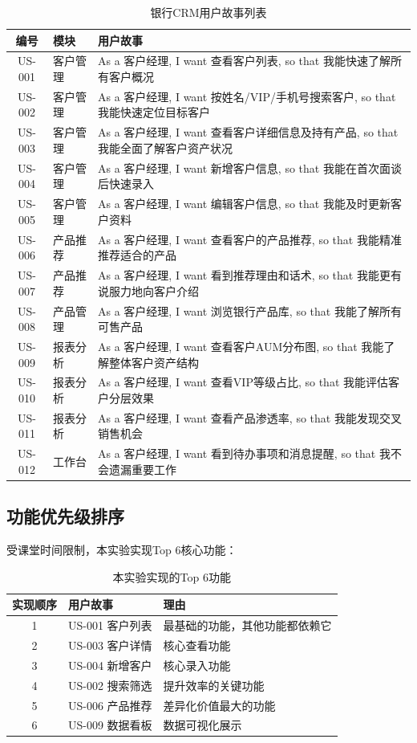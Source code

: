 \begin{table}[H]
\centering
\small
\begin{tabular}{clp{7.5cm}}
\toprule
\textbf{编号} & \textbf{模块} & \textbf{用户故事} \\
\midrule
US-001 & 客户管理 & As a 客户经理, I want 查看客户列表, so that 我能快速了解所有客户概况 \\
US-002 & 客户管理 & As a 客户经理, I want 按姓名/VIP/手机号搜索客户, so that 我能快速定位目标客户 \\
US-003 & 客户管理 & As a 客户经理, I want 查看客户详细信息及持有产品, so that 我能全面了解客户资产状况 \\
US-004 & 客户管理 & As a 客户经理, I want 新增客户信息, so that 我能在首次面谈后快速录入 \\
US-005 & 客户管理 & As a 客户经理, I want 编辑客户信息, so that 我能及时更新客户资料 \\
US-006 & 产品推荐 & As a 客户经理, I want 查看客户的产品推荐, so that 我能精准推荐适合的产品 \\
US-007 & 产品推荐 & As a 客户经理, I want 看到推荐理由和话术, so that 我能更有说服力地向客户介绍 \\
US-008 & 产品管理 & As a 客户经理, I want 浏览银行产品库, so that 我能了解所有可售产品 \\
US-009 & 报表分析 & As a 客户经理, I want 查看客户AUM分布图, so that 我能了解整体客户资产结构 \\
US-010 & 报表分析 & As a 客户经理, I want 查看VIP等级占比, so that 我能评估客户分层效果 \\
US-011 & 报表分析 & As a 客户经理, I want 查看产品渗透率, so that 我能发现交叉销售机会 \\
US-012 & 工作台 & As a 客户经理, I want 看到待办事项和消息提醒, so that 我不会遗漏重要工作 \\
\bottomrule
\end{tabular}
\caption{银行CRM用户故事列表}
\end{table}

\subsection{功能优先级排序}

受课堂时间限制，本实验实现Top 6核心功能：

\begin{table}[H]
\centering
\begin{tabular}{cll}
\toprule
\textbf{实现顺序} & \textbf{用户故事} & \textbf{理由} \\
\midrule
1 & US-001 客户列表 & 最基础的功能，其他功能都依赖它 \\
2 & US-003 客户详情 & 核心查看功能 \\
3 & US-004 新增客户 & 核心录入功能 \\
4 & US-002 搜索筛选 & 提升效率的关键功能 \\
5 & US-006 产品推荐 & 差异化价值最大的功能 \\
6 & US-009 数据看板 & 数据可视化展示 \\
\bottomrule
\end{tabular}
\caption{本实验实现的Top 6功能}
\end{table}

